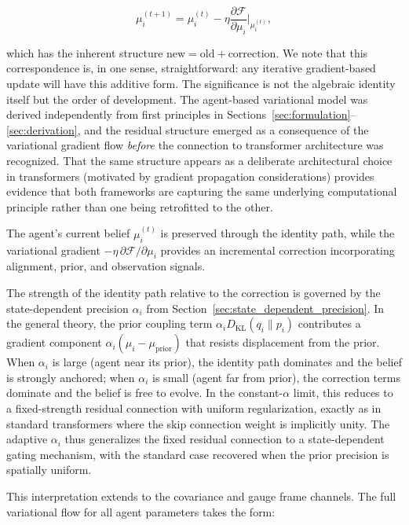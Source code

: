 \documentclass[twoside,11pt]{article}
\begin{document}
\begin{equation}
\mu_i^{(t+1)} = \mu_i^{(t)} - \eta \frac{\partial \mathcal{F}}{\partial \mu_i}\bigg|_{\mu_i^{(t)}},
\label{eq:residual_gradient_flow}
\end{equation}

which has the inherent structure $\text{new} = \text{old} + \text{correction}$. We note that this correspondence is, in one sense, straightforward: any iterative gradient-based update will have this additive form. The significance is not the algebraic identity itself but the order of development. The agent-based variational model was derived independently from first principles in Sections~\ref{sec:formulation}--\ref{sec:derivation}, and the residual structure emerged as a consequence of the variational gradient flow \emph{before} the connection to transformer architecture was recognized. That the same structure appears as a deliberate architectural choice in transformers (motivated by gradient propagation considerations) provides evidence that both frameworks are capturing the same underlying computational principle rather than one being retrofitted to the other.

The agent's current belief $\mu_i^{(t)}$ is preserved through the identity path, while the variational gradient $-\eta \,\partial \mathcal{F}/\partial \mu_i$ provides an incremental correction incorporating alignment, prior, and observation signals.

The strength of the identity path relative to the correction is governed by the state-dependent precision $\alpha_i$ from Section~\ref{sec:state_dependent_precision}. In the general theory, the prior coupling term $\alpha_i D_{\mathrm{KL}}(q_i \| p_i)$ contributes a gradient component $\alpha_i(\mu_i - \mu_{\text{prior}})$ that resists displacement from the prior. When $\alpha_i$ is large (agent near its prior), the identity path dominates and the belief is strongly anchored; when $\alpha_i$ is small (agent far from prior), the correction terms dominate and the belief is free to evolve. In the constant-$\alpha$ limit, this reduces to a fixed-strength residual connection with uniform regularization, exactly as in standard transformers where the skip connection weight is implicitly unity. The adaptive $\alpha_i$ thus generalizes the fixed residual connection to a state-dependent gating mechanism, with the standard case recovered when the prior precision is spatially uniform.

This interpretation extends to the covariance and gauge frame channels. The full variational flow for all agent parameters takes the form:
\end{document}
